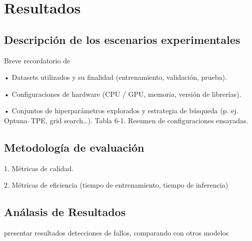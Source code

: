 \chapter{Resultados}
\section{Descripción de los escenarios experimentales}
Breve recordatorio de

	•	Datasets utilizados y su finalidad (entrenamiento, validación, prueba).
    
	•	Configuraciones de hardware (CPU / GPU, memoria, versión de librerías).
    
	•	Conjuntos de hiperparámetros explorados y estrategia de búsqueda (p. ej. Optuna–TPE, grid search…).
		Tabla 6-1. Resumen de configuraciones ensayadas.

\section{Metodología de evaluación}
    1.	Métricas de calidad.
	
    2.	Métricas de eficiencia (tiempo de entrenamiento, tiempo de inferencia)
\section{Análasis de Resultados}
presentar resultados
detecciones de fallos, comparando con otros modelos
